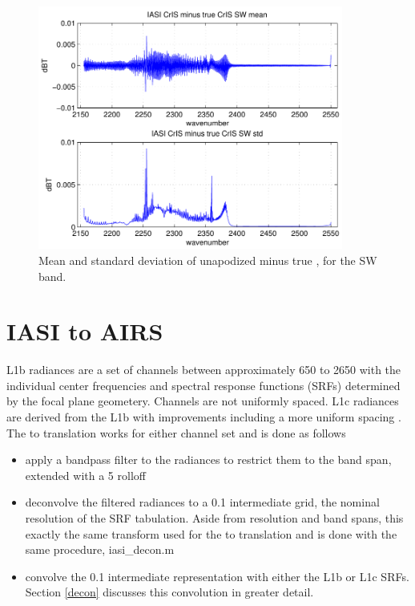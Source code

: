 \documentclass[12pt]{article}
\begin{document}
\begin{figure}
  \centering
  \includegraphics[height=8cm]{figures/iasi_cris_sw_1.pdf}
  \caption{Mean and standard deviation of unapodized {\iasi} {\cris}
    minus true {\cris}, for the {\cris} SW band.}
  \label{icsw1}
\end{figure}

\FloatBarrier


\section{IASI to AIRS}

{\airs} L1b radiances are a set of channels between approximately
650 to 2650 {\wn} with the individual center frequencies and
spectral response functions (SRFs) determined by the focal plane
geometery.  Channels are not uniformly spaced.  {\airs} L1c
radiances are derived from the L1b with improvements including a
more uniform spacing \cite{airs2}.  The {\iasi} to {\airs}
translation works for either channel set and is done as follows


\begin{itemize}

  \item apply a bandpass filter to the {\iasi} radiances to restrict
    them to the {\airs} band span, extended with a 5 {\wn} rolloff

  \item deconvolve the filtered {\iasi} radiances to a 0.1 {\wn}
    intermediate grid, the nominal resolution of the {\airs} SRF
    tabulation.  Aside from resolution and band spans, this exactly
    the same transform used for the {\iasi} to {\cris} translation
    and is done with the same procedure, iasi\_decon.m

  \item convolve the 0.1 {\wn} intermediate representation with either
    the {\airs} L1b or L1c SRFs.  Section \ref{decon} discusses this
    convolution in greater detail.
    
\end{itemize}
\end{document}
